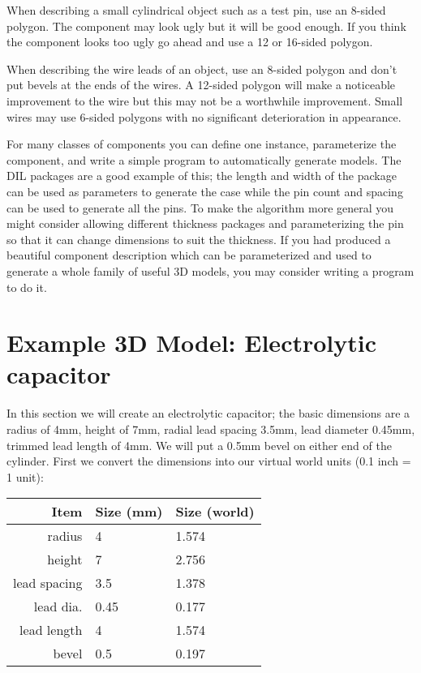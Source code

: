 \documentclass[a4paper]{article}
\begin{document}
When describing a small cylindrical object such as a test pin, use an 8-sided polygon. The component may
look ugly but it will be good enough. If you think the component looks too ugly go ahead and use a 12 or
16-sided polygon.

When describing the wire leads of an object, use an 8-sided polygon and don't put bevels at the ends
of the wires. A 12-sided polygon will make a noticeable improvement to the wire but this may not be a
worthwhile improvement. Small wires may use 6-sided polygons with no significant deterioration in
appearance.

For many classes of components you can define one instance, parameterize the component, and write a simple
program to automatically generate models. The DIL packages are a good example of this; the length and
width of the package can be used as parameters to generate the case while the pin count and spacing can be
used to generate all the pins. To make the algorithm more general you might consider allowing different
thickness packages and parameterizing the pin so that it can change dimensions to suit the thickness. If you
had produced a beautiful component description which can be parameterized and used to generate a whole
family of useful 3D models, you may consider writing a program to do it.

\section{Example 3D Model: Electrolytic capacitor}
In this section we will create an electrolytic capacitor; the basic dimensions are a radius of 4mm, height of
7mm, radial lead spacing 3.5mm, lead diameter 0.45mm, trimmed lead length of 4mm. We will put a 0.5mm bevel on
either end of the cylinder. First we convert the dimensions into our virtual world units (0.1 inch = 1 unit):

\begin{tabular}{|r|l|l|}
\hline
Item & Size (mm) & Size (world) \\
\hline
radius & 4 & 1.574\\
height & 7 & 2.756\\
lead spacing & 3.5 & 1.378\\
lead dia. & 0.45 & 0.177\\
lead length & 4 & 1.574\\
bevel & 0.5 & 0.197\\
\hline
\end{tabular}
\end{document}
